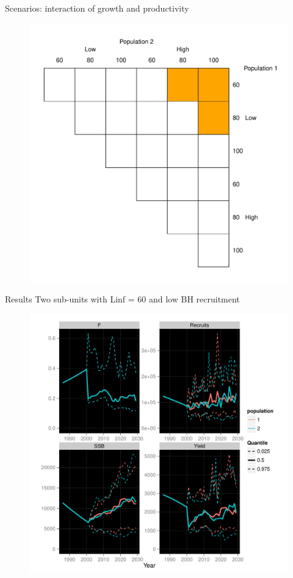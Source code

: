 \documentclass{beamer}
\begin{document}
\begin{withoutheadline}
\begin{frame}{Scenarios: interaction of growth and productivity}
  \begin{figure}
  \flushright
    \includegraphics[width=.7\textwidth]{scenario4}
  \end{figure}
\end{frame}
\end{withoutheadline}



\begin{withoutheadline}
\begin{frame}{Results}
  Two sub-units with Linf = 60 and low BH recruitment
  \begin{figure}
  \flushright
  \includegraphics[width=.7\textwidth]{full-result1}
  \end{figure}
\end{frame}
\end{withoutheadline}
\end{document}
